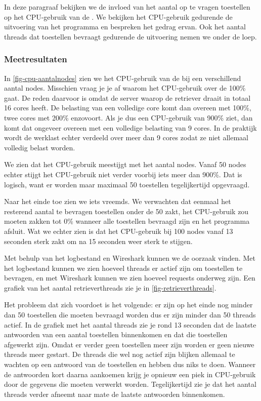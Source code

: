 In deze paragraaf bekijken we de invloed van het aantal op te vragen toestellen op het CPU-gebruik van de \nwmretriever{}.
We bekijken het CPU-gebruik gedurende de uitvoering van het programma en bespreken het gedrag ervan.
Ook het aantal threads dat toestellen bevraagt gedurende de uitvoering nemen we onder de loep.

\subsubsection{Meetresultaten}

In \cref{fig-cpu-aantalnodes} zien we het CPU-gebruik van de \nwmretriever{} bij een verschillend aantal nodes.
Misschien vraag je je af waarom het CPU-gebruik over de 100\% gaat.
De reden daarvoor is omdat de server waarop de retriever draait in totaal 16 cores heeft.
De belasting van een volledige core komt dan overeen met 100\%, twee cores met 200\% enzovoort.
Als je dus een CPU-gebruik van 900\% ziet, dan komt dat ongeveer overeen met een volledige belasting van 9 cores.
In de praktijk wordt de werklast echter verdeeld over meer dan 9 cores zodat ze niet allemaal volledig belast worden.

We zien dat het CPU-gebruik meestijgt met het aantal nodes.
Vanaf 50 nodes echter stijgt het CPU-gebruik niet verder voorbij iets meer dan 900\%.
Dat is logisch, want er worden maar maximaal 50 toestellen tegelijkertijd opgevraagd.

Naar het einde toe zien we iets vreemds.
We verwachten dat eenmaal het resterend aantal te bevragen toestellen onder de 50 zakt,
het CPU-gebruik zou moeten zakken tot 0\% wanneer alle toestellen bevraagd zijn en het programma afsluit.
Wat we echter zien is dat het CPU-gebruik bij 100 nodes vanaf 13 seconden sterk zakt om na 15 seconden weer sterk te stijgen.

Met behulp van het logbestand en Wireshark kunnen we de oorzaak vinden.
Met het logbestand kunnen we zien hoeveel threads er actief zijn om toestellen te bevragen,
en met Wireshark kunnen we zien hoeveel requests onderweg zijn.
Een grafiek van het aantal retrieverthreads zie je in \cref{fig-retrieverthreads}.

Het probleem dat zich voordoet is het volgende:
er zijn op het einde nog minder dan 50 toestellen die moeten bevraagd worden dus er zijn minder dan 50 threads actief.
In de grafiek met het aantal threads zie je rond 13 seconden dat de laatste antwoorden van een aantal toestellen binnenkomen en dat die toestellen afgewerkt zijn.
Omdat er verder geen toestellen meer zijn worden er geen nieuwe threads meer gestart.
De threads die wel nog actief zijn blijken allemaal te wachten op een antwoord van de toestellen en hebben dus niks te doen.
Wanneer de antwoorden kort daarna aankoemen krijg je opnieuw een piek in CPU-gebruik door de gegevens die moeten verwerkt worden.
Tegelijkertijd zie je dat het aantal threads verder afneemt naar mate de laatste antwoorden binnenkomen.

